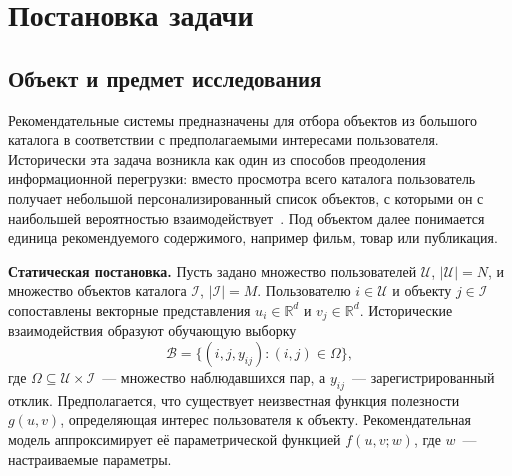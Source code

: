 \section{Постановка задачи}
\label{sec:Chapter1} 

\subsection{Объект и предмет исследования}
\label{subsec:object}

Рекомендательные системы предназначены для отбора объектов из большого каталога
в соответствии с предполагаемыми интересами пользователя. Исторически эта
задача возникла как один из способов преодоления информационной перегрузки:
вместо просмотра всего каталога пользователь получает небольшой
персонализированный список объектов, с которыми он с наибольшей вероятностью
взаимодействует~\cite{adomavicius2005}. Под объектом далее понимается единица
рекомендуемого содержимого, например фильм, товар или публикация.

\textbf{Статическая постановка.} Пусть задано множество пользователей
$\mathcal U$, $|\mathcal U|=N$, и множество объектов каталога $\mathcal I$,
$|\mathcal I|=M$. Пользователю $i\in\mathcal U$ и объекту $j\in\mathcal I$
сопоставлены векторные представления $u_i\in\mathbb R^d$ и
$v_j\in\mathbb R^d$. Исторические взаимодействия образуют обучающую выборку
\[
    \mathcal B
    =\{(i,j,y_{ij}) : (i,j)\in\Omega\},
\]
где $\Omega\subseteq\mathcal U\times\mathcal I$~--- множество наблюдавшихся
пар, а $y_{ij}$~--- зарегистрированный отклик. Предполагается, что существует
неизвестная функция полезности $g(u,v)$, определяющая интерес пользователя к
объекту. Рекомендательная модель аппроксимирует её параметрической функцией
$f(u,v;w)$, где $w$~--- настраиваемые параметры.


